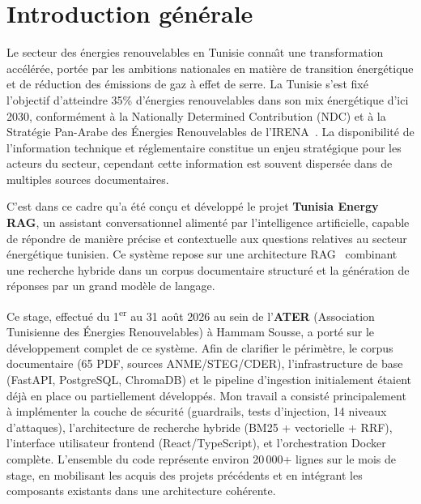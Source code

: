 \documentclass[12pt,a4paper,oneside]{report}
\begin{document}
\clearpage







\chapter*{Introduction g\'{e}n\'{e}rale}



Le secteur des \'{e}nergies renouvelables en Tunisie conna\^{\i}t une transformation acc\'{e}l\'{e}r\'{e}e, port\'{e}e par les ambitions nationales en mati\`{e}re de transition \'{e}nerg\'{e}tique et de r\'{e}duction des \'{e}missions de gaz \`{a} effet de serre. La Tunisie s'est fix\'{e} l'objectif d'atteindre 35\% d'\'{e}nergies renouvelables dans son mix \'{e}nerg\'{e}tique d'ici 2030, conform\'{e}ment \`{a} la Nationally Determined Contribution (NDC) et \`{a} la Strat\'{e}gie Pan-Arabe des \'Energies Renouvelables de l'IRENA~\cite{irena2024}. La disponibilit\'{e} de l'information technique et r\'{e}glementaire constitue un enjeu strat\'{e}gique pour les acteurs du secteur, cependant cette information est souvent dispers\'{e}e dans de multiples sources documentaires.



C'est dans ce cadre qu'a \'{e}t\'{e} con\c{c}u et d\'{e}velopp\'{e} le projet \textbf{Tunisia Energy RAG}, un assistant conversationnel aliment\'{e} par l'intelligence artificielle, capable de r\'{e}pondre de mani\`{e}re pr\'{e}cise et contextuelle aux questions relatives au secteur \'{e}nerg\'{e}tique tunisien. Ce syst\`{e}me repose sur une architecture RAG~\cite{lewis2020rag} combinant une recherche hybride dans un corpus documentaire structur\'{e} et la g\'{e}n\'{e}ration de r\'{e}ponses par un grand mod\`{e}le de langage.



Ce stage, effectu\'{e} du 1\textsuperscript{er} au 31 ao\^{u}t 2026 au sein de l'\textbf{ATER} (Association Tunisienne des \'{E}nergies Renouvelables) \`{a} Hammam Sousse, a port\'{e} sur le d\'{e}veloppement complet de ce syst\`{e}me. Afin de clarifier le p\'{e}rim\`{e}tre, le corpus documentaire (65 PDF, sources ANME/STEG/CDER), l'infrastructure de base (FastAPI, PostgreSQL, ChromaDB) et le pipeline d'ingestion initialement \'{e}taient d\'{e}j\`{a} en place ou partiellement d\'{e}velopp\'{e}s. Mon travail a consist\'{e} principalement \`{a} impl\'{e}menter la couche de s\'{e}curit\'{e} (guardrails, tests d'injection, 14 niveaux d'attaques), l'architecture de recherche hybride (BM25 + vectorielle + RRF), l'interface utilisateur frontend (React/TypeScript), et l'orchestration Docker compl\`{e}te. L'ensemble du code repr\'{e}sente environ 20\,000+ lignes sur le mois de stage, en mobilisant les acquis des projets pr\'{e}c\'{e}dents et en int\'{e}grant les composants existants dans une architecture coh\'{e}rente.
\end{document}
